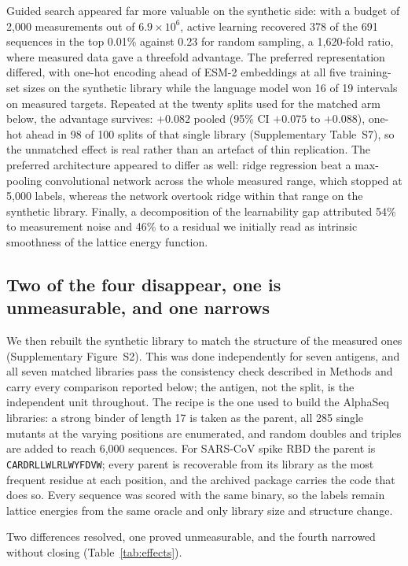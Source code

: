 \documentclass[pdflatex,sn-nature]{sn-jnl}
\theoremstyle{thmstyleone}
\theoremstyle{thmstyletwo}
\theoremstyle{thmstylethree}
\begin{document}
Guided search appeared far more valuable on the synthetic side: with a budget
of 2{,}000 measurements out of $6.9\times10^{6}$, active learning recovered 378
of the 691 sequences in the top 0.01\% against 0.23 for random sampling, a
1{,}620-fold ratio, where measured data gave a threefold advantage. The
preferred representation differed, with one-hot encoding ahead of ESM-2
embeddings \cite{lin2023} at all five training-set sizes on the synthetic
library while the language model won 16 of 19 intervals on measured targets.
Repeated at the twenty splits used for the matched arm below, the advantage
survives: $+0.082$ pooled (95\% CI $+0.075$ to $+0.088$), one-hot ahead in 98
of 100 splits of that single library (Supplementary Table~S7), so the unmatched effect is real rather
than an artefact of thin replication. The preferred architecture appeared to differ
as well: ridge regression beat a max-pooling convolutional network across the
whole measured range, which stopped at 5{,}000 labels, whereas the network
overtook ridge within that range on the synthetic library. Finally, a
decomposition of the learnability gap attributed 54\% to measurement noise and
46\% to a residual we initially read as intrinsic smoothness of the lattice
energy function.

\subsection*{Two of the four disappear, one is unmeasurable, and one narrows}

We then rebuilt the synthetic library to match the structure of the measured
ones (Supplementary Figure~S2). This was done independently for seven
antigens, and all seven matched libraries pass the consistency check described
in Methods and carry every comparison reported below; the antigen, not the
split, is the independent unit throughout. The recipe is the one used to build
the AlphaSeq libraries: a strong binder of length 17 is taken as the parent,
all 285 single mutants at the varying positions are enumerated, and random
doubles and triples are added to reach 6{,}000 sequences. For SARS-CoV spike
RBD the parent is \texttt{CARDRLLWLRLWYFDVW}; every parent is recoverable
from its library as the most frequent residue at each position, and the
archived package \cite{libmatch2026} carries the code that does so. Every sequence was scored with the same binary, so
the labels remain lattice energies from the same oracle and only library size
and structure change.

Two differences resolved, one proved unmeasurable, and the fourth narrowed
without closing (Table~\ref{tab:effects}).
\end{document}
